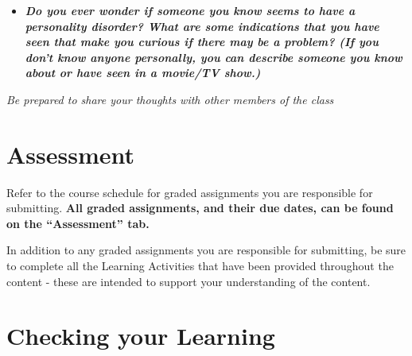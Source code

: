 \documentclass[
]{book}
\providecommand{\tightlist}{%
  \setlength{\itemsep}{0pt}\setlength{\parskip}{0pt}}
\begin{document}
\begin{reflect}
\begin{itemize}
\tightlist
\item
  \textbf{\emph{Do you ever wonder if someone you know seems to have a personality disorder? What are some indications that you have seen that make you curious if there may be a problem? (If you don't know anyone personally, you can describe someone you know about or have seen in a movie/TV show.)}}
\end{itemize}

\emph{Be prepared to share your thoughts with other members of the class}
\end{reflect}

\hypertarget{assessment-9}{%
\section*{Assessment}\label{assessment-9}}

\begin{assessment}
Refer to the course schedule for graded assignments you are responsible for submitting. \textbf{All graded assignments, and their due dates, can be found on the ``Assessment'' tab.}

In addition to any graded assignments you are responsible for submitting, be sure to complete all the Learning Activities that have been provided throughout the content - these are intended to support your understanding of the content.
\end{assessment}

\hypertarget{checking-your-learning-9}{%
\section*{Checking your Learning}\label{checking-your-learning-9}}
\end{document}

